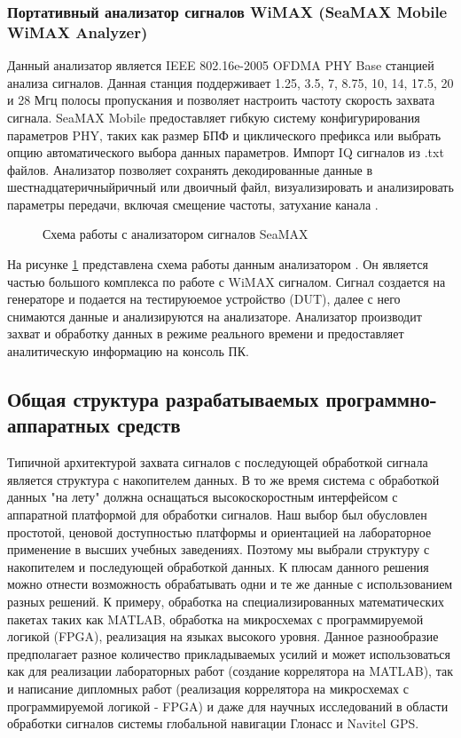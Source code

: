 \subsubsection{Портативный анализатор сигналов WiMAX (SeaMAX Mobile WiMAX Analyzer)}
Данный анализатор является IEEE 802.16e-2005 OFDMA PHY Base станцией анализа сигналов. Данная станция 
поддерживает 1.25, 3.5, 7, 8.75, 10, 14, 17.5, 20 и 28 Мгц полосы пропускания и позволяет настроить
частоту скорость захвата сигнала. SeaMAX Mobile предоставляет гибкую систему конфигурирования параметров PHY, таких как
размер БПФ и циклического префикса или выбрать опцию автоматического выбора данных параметров. Импорт IQ сигналов
из .txt файлов. Анализатор позволяет сохранять декодированные данные в шестнадцатеричныйричный или двоичный файл,
визуализировать и анализировать параметры передачи, включая смещение частоты, затухание канала
\cite{seamax_overview, seamax_pdf}.

\begin{figure}[H]
\caption{Схема работы с анализатором сигналов SeaMAX}
\label{seamax}
\end{figure}

На рисунке \ref{seamax} представлена схема работы данным анализатором \cite{seamax_pdf}. Он является частью большого комплекса по работе
с WiMAX сигналом. Сигнал создается на генераторе и подается на тестируюемое устройство (DUT), далее с него снимаются 
данные и анализируются на анализаторе. Анализатор производит захват и обработку данных в режиме реального времени и
предоставляет аналитическую информацию на консоль ПК.

\subsection{Общая структура разрабатываемых программно-аппаратных средств}
\label{razdel13}

Типичной архитектурой захвата сигналов с последующей обработкой сигнала является структура с накопителем данных. В то же время
система с обработкой данных "на лету" должна оснащаться высокоскоростным интерфейсом с аппаратной платформой для обработки
сигналов. Наш выбор был обусловлен простотой, ценовой доступностью платформы и ориентацией на лабораторное применение
в высших учебных заведениях. Поэтому мы выбрали структуру с накопителем и последующей обработкой данных. К плюсам данного решения
можно отнести возможность обрабатывать одни и те же данные с использованием разных решений. К примеру, обработка на специализированных
математических пакетах таких как MATLAB, обработка на микросхемах с программируемой логикой (FPGA), реализация на языках высокого уровня.
Данное разнообразие предполагает разное количество прикладываемых усилий и может использоваться как для реализации лабораторных работ
(создание коррелятора на MATLAB), так и написание дипломных работ (реализация коррелятора на микросхемах с программируемой логикой - FPGA) и
даже для научных исследований в области обработки сигналов системы глобальной навигации Глонасс и Navitel GPS.

